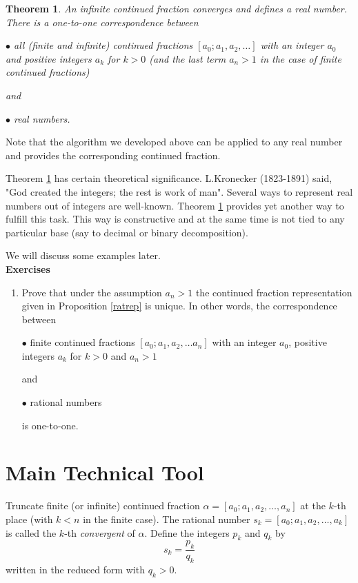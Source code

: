 \documentclass[12pt,letterpaper]{book}
\newtheorem{theorem}{Theorem}
\begin{document}
\begin{theorem} \label{realrep}
An infinite continued fraction converges and defines a real number.
There is a one-to-one correspondence between

$\bullet$ all (finite and infinite) continued fractions
$[a_0;a_1,a_2, \ldots]$ with an integer $a_0$ and positive integers
$a_k$ for $k>0$ (and the last term $a_n>1$ in the case of finite
continued fractions)

and

$\bullet$ real numbers.

\end{theorem}

Note that the algorithm we developed above can be applied to any
real number and provides the corresponding continued fraction.

Theorem \ref{realrep} has certain theoretical significance.
L.Kronecker  (1823-1891) said, "God created the integers;  the rest
is  work of man". Several ways to represent real numbers out of
integers are well-known. Theorem \ref{realrep} provides yet another
way to fulfill this task. This way is constructive and at the same
time is not tied to any particular base (say to decimal or binary
decomposition).

We will discuss some examples later. \\
\textbf{Exercises}
\begin{enumerate}
\item{Prove that under the assumption $a_n>1$ the continued
fraction representation given in Proposition \ref{ratrep} is unique.
In other words, the correspondence between

$\bullet$ finite continued fractions $[a_0;a_1,a_2, \ldots a_n]$
with an integer $a_0$, positive integers $a_k$ for $k>0$ and $a_n>1$

and

$\bullet$ rational numbers

is one-to-one.}
\end{enumerate}

\section{Main Technical Tool}

Truncate finite (or infinite) continued fraction
$\alpha=[a_0;a_1,a_2, \ldots, a_n]$ at the $k$-th place (with $k<n$
in the finite case). The rational number $s_k=[a_0;a_1,a_2, \ldots,
a_k]$ is called the $k$-th {\sl convergent} of $\alpha$. Define the
integers $p_k$ and $q_k$ by
\begin{equation} \label{d2}
s_k = \frac{p_k}{q_k}
\end{equation}
written in the reduced form with $q_k>0$.
\end{document}
